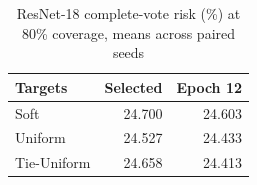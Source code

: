 \begin{table}[t]
\caption{ResNet-18 complete-vote risk (\%) at 80\% coverage, means across paired seeds}\label{tab:resnetrisk}
\centering\begin{tabular}{lrr}\toprule
Targets & Selected & Epoch 12\\\midrule
Soft & 24.700 & 24.603\\
Uniform & 24.527 & 24.433\\
Tie-Uniform & 24.658 & 24.413\\
\bottomrule\end{tabular}\par
\end{table}
